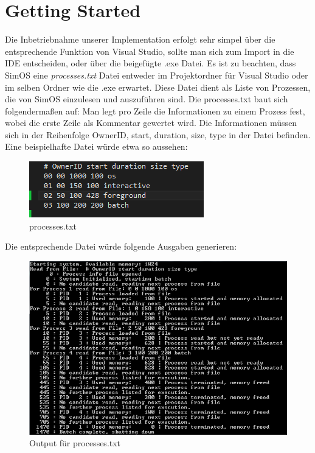 \section{Getting Started}
Die Inbetriebnahme unserer Implementation erfolgt sehr simpel über die entsprechende Funktion von Visual Studio, sollte man sich zum Import in die IDE entscheiden, oder über die beigefügte .exe Datei.
Es ist zu beachten, dass SimOS eine \textit{processes.txt} Datei entweder im Projektordner für Visual Studio oder im selben Ordner wie die .exe erwartet. Diese Datei dient als Liste von Prozessen, die von SimOS einzulesen und auszuführen sind.
Die processes.txt baut sich folgendermaßen auf: Man legt pro Zeile die Informationen zu einem Prozess fest, wobei die erste Zeile als Kommentar gewertet wird. Die Informationen müssen sich in der Reihenfolge OwnerID, start, duration, size, type in der Datei befinden.
Eine beispielhafte Datei würde etwa so aussehen: \\
\begin{figure}[!h]
    \includegraphics[scale=1]{img/processes}
    \caption{processes.txt}
\end{figure}

Die entsprechende Datei würde folgende Ausgaben generieren:\\
\begin{figure}[!h]
    \includegraphics[scale=1]{img/output}
    \caption{Output für processes.txt}
\end{figure}
